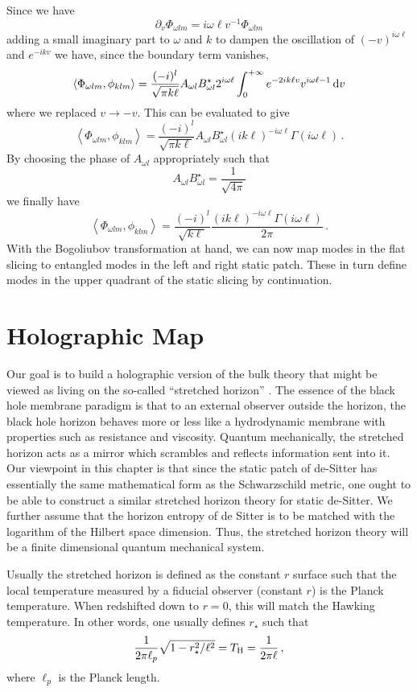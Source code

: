 \documentclass{brownthesis}
\def\dd{{\rm d}}
\begin{document}
Since we have
\[
\partial_{v}\Phi_{\omega lm}=i\omega\ell v^{-1}\Phi_{\omega lm}
\]
adding a small imaginary part to $\omega$ and $k$ to dampen the
oscillation of $(-v)^{i\omega\ell}$ and $e^{-ikv}$ we have, since
the boundary term vanishes,
\[
\left\langle \Phi_{\omega lm},\phi_{klm}\right\rangle =\frac{(-i)^{l}}{\sqrt{\pi k\ell}}A_{\omega l}B_{\omega l}^{\star}2^{i\omega\ell}\int_{0}^{+\infty}e^{-2ik\ell v}v^{i\omega\ell-1}\,\dd v
\]
where we replaced $v\to-v$. This can be evaluated to give
\[
\left\langle \Phi_{\omega lm},\phi_{klm}\right\rangle =\frac{(-i)^{l}}{\sqrt{\pi k\ell}}A_{\omega l}B_{\omega l}^{\star}(ik\ell)^{-i\omega\ell}\Gamma(i\omega\ell)\,.
\]
By choosing the phase of $A_{\omega l}$ appropriately such that
\[
A_{\omega l}B_{\omega l}^{\star}=\frac{1}{\sqrt{4\pi}}
\]
we finally have
\[
\left\langle \Phi_{\omega lm},\phi_{klm}\right\rangle =\frac{(-i)^{l}}{\sqrt{k\ell}}\frac{(ik\ell)^{-i\omega\ell}\Gamma(i\omega\ell)}{2\pi}\,.
\]
With the Bogoliubov transformation at hand, we can now map modes in
the flat slicing to entangled modes in the left and right static patch.
These in turn define modes in the upper quadrant of the static slicing
by continuation.

\section{Holographic Map}

Our goal is to build a holographic version of the bulk theory that
might be viewed as living on the so-called ``stretched horizon''
\cite{thorne1986black}. The essence of the black hole membrane paradigm
is that to an external observer outside the horizon, the black hole
horizon behaves more or less like a hydrodynamic membrane with properties
such as resistance and viscosity. Quantum mechanically, the stretched
horizon acts as a mirror \cite{Hayden:2007cs} which scrambles and
reflects information sent into it. Our viewpoint in this chapter is
that since the static patch of de-Sitter has essentially the same
mathematical form as the Schwarzschild metric, one ought to be able
to construct a similar stretched horizon theory for static de-Sitter.
We further assume that the horizon entropy of de Sitter is to be matched
with the logarithm of the Hilbert space dimension. Thus, the stretched
horizon theory will be a finite dimensional quantum mechanical system.

Usually the stretched horizon is defined as the constant $r$ surface
such that the local temperature measured by a fiducial observer (constant
$r$) is the Planck temperature. When redshifted down to $r=0$, this
will match the Hawking temperature. In other words, one usually defines
$r_{\star}$ such that
\begin{equation}
\frac{1}{2\pi\ell_{p}}\sqrt{1-r_{\star}^{2}/\ell^{2}}=T_{{\rm H}}=\frac{1}{2\pi\ell}\,,\label{eq:usualrs}
\end{equation}
where $\ell_{p}$ is the Planck length.
\end{document}
